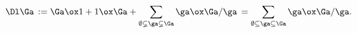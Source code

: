 \begin{equation}
\Dl \Ga\, := \Ga \ox 1 + 1 \ox \Ga
+ \sum_{\emptyset\varsubsetneq\ga\varsubsetneq\Ga} \ga \ox \Ga/\ga\,
= \sum_{\emptyset \subseteq \ga \subseteq \Ga} \ga \ox \Ga/\ga.
\label{eq:coprod} %
\end{equation}

